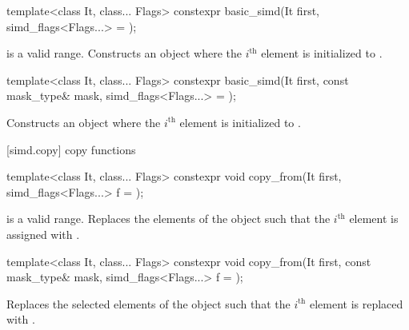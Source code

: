 \begin{itemdecl}
template<class It, class... Flags>
  constexpr basic_simd(It first, simd_flags<Flags...> = {});
\end{itemdecl}

\begin{itemdescr}
  \SimdLoadDescr
    {\tcode{[first, first + size())} is a valid range.}
    {Constructs an object where the $i^\text{th}$ element is initialized to  \foralli.}
\end{itemdescr}

\begin{itemdecl}
template<class It, class... Flags>
  constexpr basic_simd(It first, const mask_type& mask, simd_flags<Flags...> = {});
\end{itemdecl}

\begin{itemdescr}
  \SimdLoadDescr
    {\validMaskedRange}
    {Constructs an object where the $i^\text{th}$ element is initialized to  \foralli.}
\end{itemdescr}

[simd.copy]{ copy functions}

\begin{itemdecl}
template<class It, class... Flags>
  constexpr void copy_from(It first, simd_flags<Flags...> f = {});
\end{itemdecl}

\begin{itemdescr}
  \SimdLoadDescr
    {\tcode{[first, first + size())} is a valid range.}
    {Replaces the elements of the  object such that the $i^\text{th}$ element is assigned with  \foralli.}
\end{itemdescr}

\begin{itemdecl}
template<class It, class... Flags>
  constexpr void copy_from(It first, const mask_type& mask, simd_flags<Flags...> f = {});
\end{itemdecl}

\begin{itemdescr}
  \SimdLoadDescr
    {\validMaskedRange}
    {Replaces the selected elements of the  object such that the $i^\text{th}$ element is replaced with  \forallmaskedi.}
\end{itemdescr}

